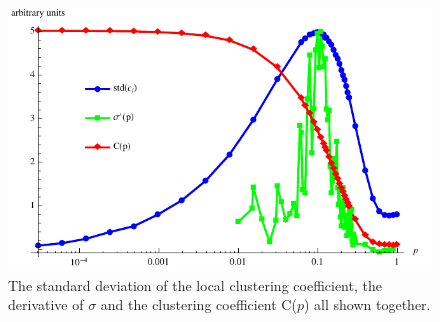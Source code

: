 \documentclass[10pt,a4paper]{article}
\begin{document}
\begin{figure}[H]
  \centering
  \includegraphics[scale=0.7]{std.pdf}
  \caption{The standard deviation of the local clustering coefficient, the derivative of $\sigma$ and the clustering coefficient C($p$) all shown together.}
  \label{fig:std}
\end{figure}
\end{document}
